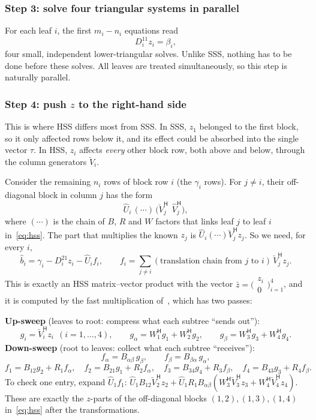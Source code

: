 \documentclass[11pt]{article}
\newcommand{\ct}{^{\mathsf H}}            %
\newcommand{\hU}{\widehat U}
\newcommand{\hV}{\widehat V}
\newcommand{\cV}{\breve V}
\newcommand{\hb}{\hat b}
\theoremstyle{definition}
\begin{document}
\subsubsection*{Step 3: solve four triangular systems in parallel}

For each leaf $i$, the first $m_i-n_i$ equations read
\[
D_i^{11}z_i = \beta_i ,
\]
four small, independent lower-triangular solves. Unlike SSS, nothing has to
be done before these solves. All leaves are treated simultaneously, so this step
is naturally parallel.

\subsubsection*{\texorpdfstring{Step 4: push $z$ to the right-hand side}{Step 4: push z to the right-hand side}}

This is where HSS differs most from SSS. In SSS, $z_1$ belonged to the first
block, so it only affected rows below it, and its effect could be absorbed into
the single vector $\tau$. In HSS, $z_i$ affects \emph{every} other block row, both
above and below, through the column generators $\cV_i$.

Consider the remaining $n_i$ rows of block row $i$ (the $\gamma_i$ rows). For
$j\ne i$, their off-diagonal block in column $j$ has the form
\[
\hU_i\,(\cdots)\,\bigl(\cV_j\ct\ \ \hV_j\ct\bigr),
\]
where $(\cdots)$ is the chain of $B$, $R$ and $W$ factors that links leaf $j$ to
leaf $i$ in~\eqref{eq:hss}. The part that multiplies the known $z_j$ is
$\hU_i(\cdots)\cV_j\ct z_j$. So we need, for every $i$,
\[
\hb_i = \gamma_i - D_i^{21}z_i - \hU_i f_i,
\qquad
f_i = \sum_{j\ne i} (\text{translation chain from } j \text{ to } i)\,\cV_j\ct z_j .
\]
This is exactly an HSS matrix--vector product with the vector
$\bar z = \bigl(\begin{smallmatrix}z_i\\0\end{smallmatrix}\bigr)_{i=1}^4$, and it is computed
by the fast multiplication of~\cite[Section~3]{CGP06}, which has two passes:

\medskip
\noindent\textbf{Up-sweep} (leaves to root: compress what each subtree ``sends out''):
\[
g_i = \cV_i\ct z_i\ \ (i=1,\dots,4),\qquad
g_\alpha = W_1\ct g_1 + W_2\ct g_2,\qquad
g_\beta = W_3\ct g_3 + W_4\ct g_4 .
\]
\textbf{Down-sweep} (root to leaves: collect what each subtree ``receives''):
\[
f_\alpha = B_{\alpha\beta}\,g_\beta,\qquad f_\beta = B_{\beta\alpha}\,g_\alpha,
\]
\[
f_1 = B_{12}g_2 + R_1f_\alpha,\quad
f_2 = B_{21}g_1 + R_2f_\alpha,\quad
f_3 = B_{34}g_4 + R_3f_\beta,\quad
f_4 = B_{43}g_3 + R_4f_\beta .
\]
To check one entry, expand $\hU_1f_1$:
$\hU_1B_{12}\cV_2\ct z_2 + \hU_1R_1B_{\alpha\beta}(W_3\ct\cV_3\ct z_3 + W_4\ct\cV_4\ct z_4)$.
These are exactly the $z$-parts of the off-diagonal blocks $(1,2),(1,3),(1,4)$
in~\eqref{eq:hss} after the transformations.
\end{document}
